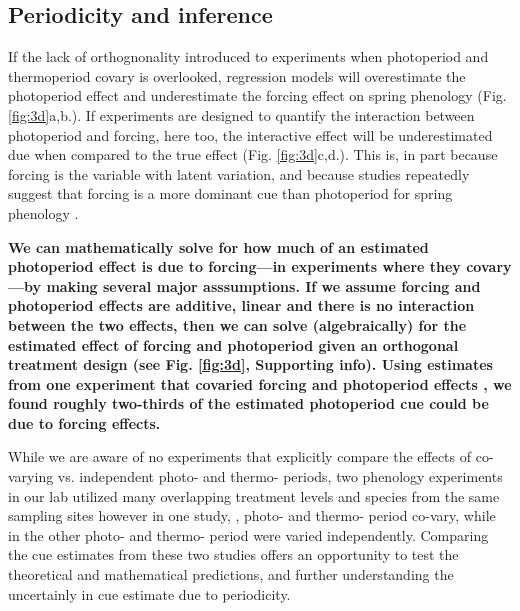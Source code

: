 \documentclass[11pt]{article}
\begin{document}
\subsection*{Periodicity and inference}
If the lack of orthognonality introduced to experiments when photoperiod and thermoperiod covary is overlooked, regression models will overestimate the photoperiod effect and underestimate the forcing effect on spring phenology 
(Fig. \ref{fig:3d}a,b.). If experiments are designed to quantify the interaction between photoperiod and forcing, here too, the interactive effect will be underestimated due when compared to the true effect (Fig. \ref{fig:3d}c,d.). This is, in part because forcing is the variable with latent variation, and because studies repeatedly suggest that forcing is a more dominant cue than photoperiod for spring phenology \citep{CHUINE:2010wg,Zohner:2016uz,Gauzere2019}.%

\textbf{We can mathematically solve for how much of an estimated photoperiod effect is due to forcing---in experiments where they covary---by making several major asssumptions. If we assume forcing and photoperiod effects are additive, linear and there is no interaction between the two effects, then we can solve (algebraically) for the estimated effect of forcing and photoperiod given an orthogonal treatment design (see Fig. \ref{fig:3d}, Supporting info). Using estimates from one experiment that covaried forcing and photoperiod effects \citet{Flynn2018}, we found roughly two-thirds of the estimated photoperiod cue could be due to forcing effects.} %

While we are aware of no experiments that explicitly compare the effects of co-varying vs. independent photo- and thermo- periods, two phenology experiments in our lab utilized many overlapping treatment levels and species from the same sampling sites however in one study, \citet{Flynn2018}, photo- and thermo- period co-vary, while in the other \citet{Buonaiuto:2021ug}  photo- and thermo- period were varied independently. Comparing the cue estimates from these two studies offers an opportunity to test the theoretical and mathematical predictions, and further understanding the uncertainly in cue estimate due to periodicity.
\end{document}
